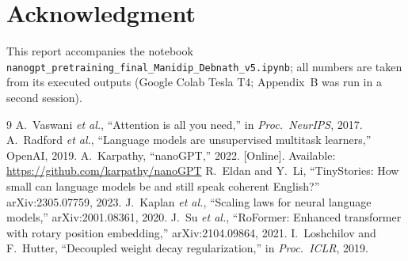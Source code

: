 \documentclass[10pt,twocolumn]{article}
\begin{document}
\section*{Acknowledgment}
This report accompanies the notebook \texttt{nanogpt\_pretraining\_final\_Manidip\_Debnath\_v5.ipynb}; all numbers are taken from its executed outputs (Google Colab Tesla T4; Appendix~B was run in a second session).

\begin{thebibliography}{9}\footnotesize
{}A.~Vaswani \emph{et al.}, ``Attention is all you need,'' in \emph{Proc.\ NeurIPS}, 2017.
A.~Radford \emph{et al.}, ``Language models are unsupervised multitask learners,'' OpenAI, 2019.
A.~Karpathy, ``nanoGPT,'' 2022. [Online]. Available: \url{https://github.com/karpathy/nanoGPT}
R.~Eldan and Y.~Li, ``TinyStories: How small can language models be and still speak coherent English?'' arXiv:2305.07759, 2023.
J.~Kaplan \emph{et al.}, ``Scaling laws for neural language models,'' arXiv:2001.08361, 2020.
J.~Su \emph{et al.}, ``RoFormer: Enhanced transformer with rotary position embedding,'' arXiv:2104.09864, 2021.
I.~Loshchilov and F.~Hutter, ``Decoupled weight decay regularization,'' in \emph{Proc.\ ICLR}, 2019.
\end{thebibliography}
\end{document}
